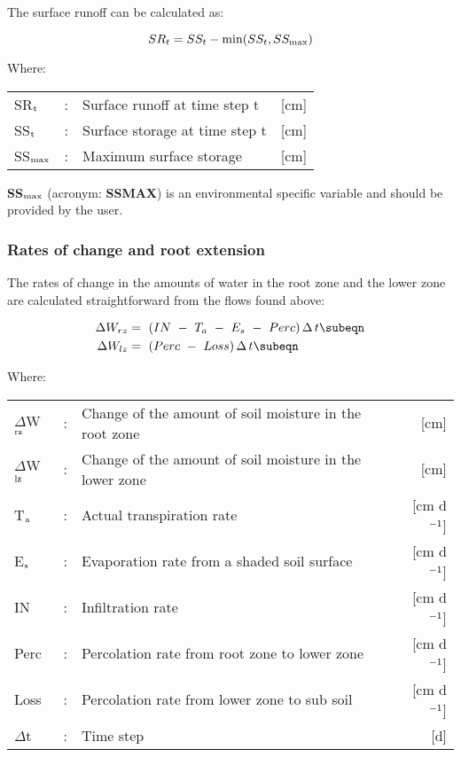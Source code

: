 The surface runoff can be calculated as:

\begin{equation}
SR_{t} = SS_{t} - \min (SS_{t}, SS_{\max})\\
\end{equation}

Where:\\[5pt]
\begin{tabularx}{\textwidth}{llXr}
SR$_{{\rm t}}$ &:& Surface runoff at time step t  & [cm]\\
SS$_{{\rm t}}$ &:& Surface storage at time step t  & [cm]\\
SS$_{{\rm max}}$ &:& Maximum surface storage  & [cm]\\
\end{tabularx}
 
{\bf SS$_{{\rm max}}$} (acronym: {\bf SSMAX}) is an environmental specific variable 
and should be provided by the user.

\subsubsection{Rates of change and root extension}
The rates of change in the amounts of water in the root zone and the lower zone are
calculated straightforward from the flows found above:

\begin{align}
\label{eq:6.31}
\Delta W _{rz} &=~ (IN ~-~ T _{a} ~-~ E _{s} ~-~ Perc)\,\Delta \, t  \subeqn  \\
\Delta W _{lz} &=~ (Perc ~-~ Loss)\,\Delta \, t \subeqn
\end{align}

Where:\\[5pt]
\begin{tabularx}{\textwidth}{llXr}
$\Delta$W$_{{\rm rz}}$ &:& Change of the amount of soil moisture in the root zone  & [cm]\\
$\Delta$W$_{{\rm lz}}$ &:& Change of the amount of soil moisture in the lower zone  & [cm]\\
T$_{{\rm a}}$ &:& Actual transpiration rate   & [cm d$^{{\rm -1}}$]\\
E$_{{\rm s}}$ &:& Evaporation rate from a shaded soil surface  & [cm d$^{{\rm -1}}$]\\
IN &:& Infiltration rate  & [cm d$^{{\rm -1}}$]\\
Perc &:& Percolation rate from root zone to lower zone  & [cm d$^{{\rm -1}}$]\\
Loss &:& Percolation rate from lower zone to sub soil  & [cm d$^{{\rm -1}}$]\\
$\Delta$t &:& Time step  & [d]\\
\end{tabularx}

